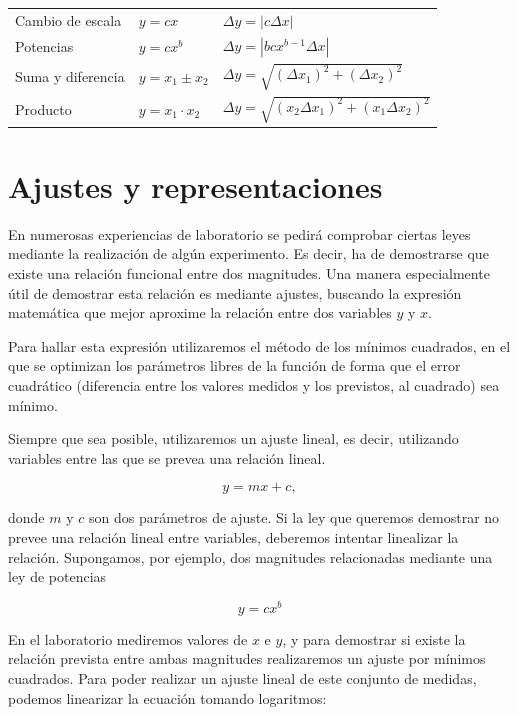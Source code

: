 \documentclass{book}
\begin{document}
\begin{center}
  \renewcommand{\arraystretch}{1.75}
  \begin{tabular}{lll}
    Cambio de escala & $y = c x$ & $\Delta y = | c \Delta x |$  \\
    Potencias & $y = c x^b$ & $\Delta y = | b c x^{b-1} \Delta x|$ \\
    Suma y diferencia & $y = x_1 \pm x_2$ & $\Delta y = \sqrt{(\Delta x_1)^2 + (\Delta x_2)^2}$ \\
    Producto & $y = x_1 \cdot x_2$ & $\Delta y = \sqrt{(x_2 \Delta x_1)^2 + (x_1 \Delta x_2)^2}$ \\ 
  \end{tabular} 
\end{center}


\section{Ajustes y representaciones}

En numerosas experiencias de laboratorio se pedirá comprobar ciertas leyes mediante la realización
de algún experimento. Es decir, ha de demostrarse que existe una relación funcional entre dos
magnitudes. Una manera especialmente útil de demostrar esta relación es mediante ajustes, buscando
la expresión matemática que mejor aproxime la relación entre dos variables $y$ y $x$.

Para hallar esta expresión utilizaremos el método de los mínimos cuadrados, en el que se optimizan
los parámetros libres de la función de forma que el error cuadrático (diferencia entre los valores
medidos y los previstos, al cuadrado) sea mínimo.

Siempre que sea posible, utilizaremos un ajuste lineal, es decir, utilizando variables entre las
que se prevea una relación lineal. 

\begin{equation}
  y = m x + c ,
\end{equation}

donde $m$ y $c$ son dos parámetros de ajuste. Si la ley que queremos demostrar no prevee una 
relación lineal
entre variables, deberemos intentar linealizar la relación. Supongamos, por ejemplo, dos magnitudes
relacionadas mediante una ley de potencias

\begin{equation}
  y = c x^b
\end{equation}

En el laboratorio mediremos valores de $x$ e $y$, y para demostrar si existe la relación prevista
entre ambas magnitudes realizaremos un ajuste por mínimos cuadrados. Para poder realizar un ajuste
lineal de este conjunto de medidas, podemos linearizar la ecuación tomando logaritmos:
\end{document}
